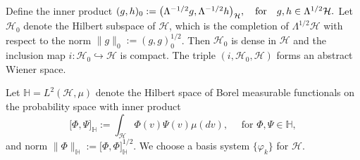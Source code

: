 \documentclass[]{interact}
\theoremstyle{plain}%
\theoremstyle{definition}
\theoremstyle{remark}
\begin{document}
        Define the inner product
    $
        ( g, h )_0 := 
        \big( 
            \Lambda^{-1/2}g ,
            \Lambda^{-1/2} h
        \big)_\mathcal{H},
        \quad 
        \hbox{\rm for}
        \quad g, h \in 
        \Lambda^{1/2} 
        \mathcal{H}.
    $
    Let $\mathcal{H}_0$ denote the Hilbert subspace of $\mathcal{H}$, which is 
    the completion of $\Lambda^{1/2} \mathcal{H}$ with respect to the norm
    $\|g\|_0:= ( g, g )_0^{1/2} $. Then ${\mathcal{H}_0}$ is
    dense in $\mathcal{H}$ and the inclusion map
    $i:\mathcal{H}_0\hookrightarrow\mathcal{H}$ is compact. The triple
    $(i,\mathcal{H}_0,\mathcal{H})$ forms an abstract Wiener space.

    Let
    $
        \mathbb{H} = L^2 (\mathcal{H}, \mu)
    $
    denote the Hilbert space of Borel
    measurable functionals on the probability space with inner
    product
    \[
        \big[ 
            \Phi,
            \Psi
        \big]_\mathbb{H}
        :=
            \int_{\mathcal{H}} 
            \Phi(v)
            \Psi(v)\mu(dv),\quad
            \text{ for } 
            \Phi,\Psi\in\mathbb{H},
    \]
    and norm 
    $\|\Phi\|_{\mathbb{H}}:=\big [\Phi,\Phi\big ]_\mathbb{H}^{1/2}$.
    We choose a basis system $\{\varphi_k\}$ for $\mathcal{H}$.
\end{document}
